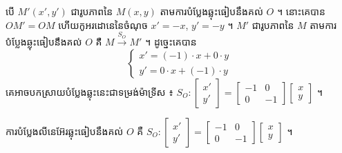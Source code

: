 \begin{center}
\end{center}

បើ $M'(x', y')$ ជារូបភាពនៃ $M(x, y)$ តាមការបំប្លែងឆ្លុះធៀបនឹងគល់ $O$ ។ នោះគេបាន $OM' = OM$ ហើយកូអរដោនេនៃចំណុច $x' = -x$, $y' = -y$ ។ $M'$ ជារូបភាពនៃ $M$ តាមការបំប្លែងឆ្លុះធៀបនឹងគល់ $O$ គឺ $M \xrightarrow{S_O} M'$ ។ ដូច្នេះគេបាន
\[ \begin{cases} x' = (-1)\cdot x + 0\cdot y\\ y' = 0\cdot x + (-1)\cdot y \end{cases} \]
គេអាចបកស្រាយបំប្លែងឆ្លុះនេះជាទម្រង់ម៉ាទ្រីស ៖ $S_O : \begin{bmatrix} x'\\ y' \end{bmatrix} = \begin{bmatrix} -1 & 0\\ 0 & -1 \end{bmatrix}\begin{bmatrix} x\\ y \end{bmatrix}$ ។

\begin{formulaBox}[ជាទូទៅ]
ការបំប្លែងលីនេអ៊ែរឆ្លុះធៀបនឹងគល់ $O$ គឺ $S_O : \begin{bmatrix} x'\\ y' \end{bmatrix} = \begin{bmatrix} -1 & 0\\ 0 & -1 \end{bmatrix}\begin{bmatrix} x\\ y \end{bmatrix}$ ។
\end{formulaBox}

